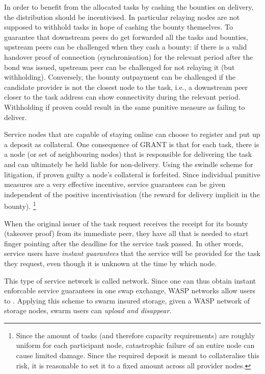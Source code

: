 In order to benefit from the allocated tasks by cashing the bounties on delivery, the distribution
should be incentivised. In particular relaying nodes are not supposed to withhold
tasks in hope of cashing the bounty themselves.
To guarantee that downstream peers do get forwarded all the tasks and bounties,
upstream peers can be challenged when they cash a bounty:
if there is a valid handover proof of connection (synchronisation)
for the relevant period after the bond was issued, upstream peer can be challenged
for not relaying it (but withholding). Conversely, the bounty outpayment can be challenged
if the candidate provider is not the closest node to the task, i.e., a downstream peer closer to
the task address can show connectivity during the relevant period. Withholding if proven could
result in the same punitive measure as failing to deliver.


Service nodes that are capable of staying online can choose to register
and put up a deposit as collateral.
One consequence of GRANT is that for each task, there is a node (or set of neighbouring nodes)
that is responsible for delivering the task and can ultimately be held liable
for non-delivery. Using the swindle scheme for litigation, if proven guilty a node's
collateral is forfeited.
Since individual punitive measures are a very
effective incentive, service guarantees can be given independent of the
positive incentivisation (the reward for delivery implicit in the bounty).%
%
\footnote{Since the amount of tasks (and therefore capacity requirements) are roughly uniform for each
participant node, catastrophic failure of an entire node can cause limited damage.
Since the required deposit is meant to collateralise this risk, it is reasonable to
set it to a fixed amount across all provider nodes.}

When the original issuer of the task request receives the receipt for its bounty (takeover proof) from its immediate peer,
they have all that is needed to start finger pointing after the deadline for the service task passed. In other words, service users have \emph{instant guarantees} that the service will be provided for the task they request, even though it is unknown at the time by which node.

This type of service network is called  network.
Since one can thus obtain instant enforcable service guarantees 
in one swap exchange, WASP networks allow users to . Applying this scheme to swarm insured storage, given a WASP network of storage nodes, swarm users can \emph{upload and disappear}.

